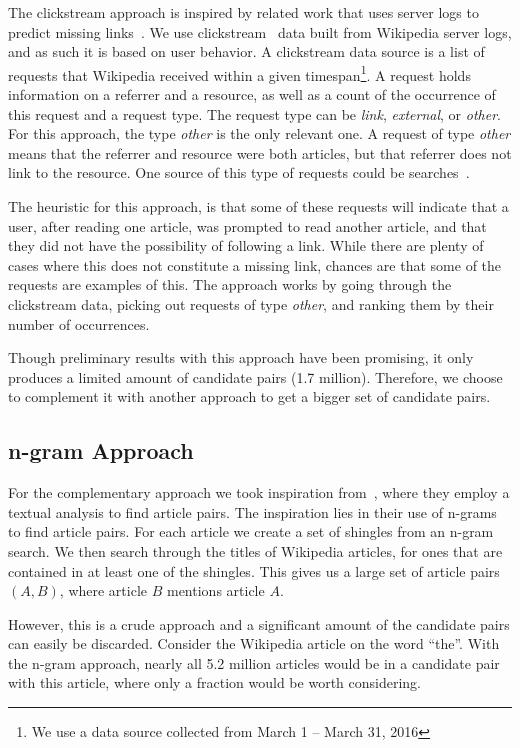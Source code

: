 The clickstream approach is inspired by related work that uses server logs to predict missing links~\cite{hyperlink-structure-using-logs}. We use clickstream~\cite{wiki-clickstream} data built from Wikipedia server logs, and as such it is based on user behavior. A clickstream data source is a list of requests that Wikipedia received within a given timespan\footnote{We use a data source collected from March 1 -- March 31, 2016}. A request holds information on a referrer and a resource, as well as a count of the occurrence of this request and a request type. The request type can be \emph{link}, \emph{external}, or \emph{other}. For this approach, the type \emph{other} is the only relevant one. A request of type \emph{other} means that the referrer and resource were both articles, but that referrer does not link to the resource. One source of this type of requests could be searches~\cite{wiki-clickstream}.

The heuristic for this approach, is that some of these requests will indicate that a user, after reading one article, was prompted to read another article, and that they did not have the possibility of following a link. While there are plenty of cases where this does not constitute a missing link, chances are that some of the requests are examples of this. The approach works by going through the clickstream data, picking out requests of type \emph{other}, and ranking them by their number of occurrences.

Though preliminary results with this approach have been promising, it only produces a limited amount of candidate pairs (1.7 million). Therefore, we choose to complement it with another approach to get a bigger set of candidate pairs.

\subsection{n-gram Approach}

For the complementary approach we took inspiration from~\cite{milne2008learning}, where they employ a textual analysis to find article pairs. The inspiration lies in their use of n-grams to find article pairs. For each article we create a set of shingles from an n-gram search. We then search through the titles of Wikipedia articles, for ones that are contained in at least one of the shingles. This gives us a large set of article pairs $(A,B)$, where article $B$ mentions article $A$.

However, this is a crude approach and a significant amount of the candidate pairs can easily be discarded. Consider the Wikipedia article on the word \enquote{the}. With the n-gram approach, nearly all 5.2 million articles would be in a candidate pair with this article, where only a fraction would be worth considering.

